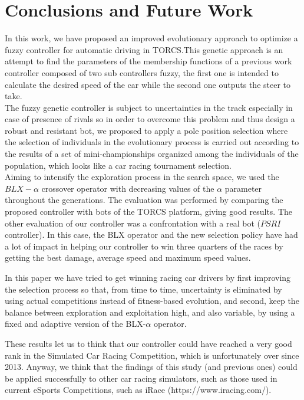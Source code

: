 \documentclass[conference]{IEEEtran}
\begin{document}
\section{Conclusions and Future Work} 
\label{sec:conclusions}

In this work, we have proposed an improved evolutionary approach to optimize a fuzzy controller for automatic driving in TORCS.This genetic approach is an attempt to find the parameters of the membership functions of a previous work controller composed of two sub controllers fuzzy, the first one is intended to calculate the desired speed of the car while the second one outputs the steer to take.\\
The fuzzy genetic controller is subject to uncertainties in the track especially in case of presence of rivals so in order to overcome this problem and thus design a robust and resistant bot, we proposed to apply a pole position selection where the selection of individuals in the evolutionary process is carried out according to the results of a set of mini-championships organized among the individuals of the population, which looks like a car racing tournament selection.\\
Aiming to intensify the exploration process in the search space, we used the $BLX-\alpha$ crossover operator with decreasing values ​​of the $\alpha$ parameter throughout the generations.
The evaluation was performed by comparing the proposed controller with bots of the TORCS platform, giving good results.
The other evaluation of our controller was a confrontation with a real bot ($PSRI$ controller). In this case, the BLX operator and the new selection policy have had a lot of impact in helping our controller to win three quarters of the races by getting the best damage, average speed and maximum speed  values.

In this paper we have tried to get winning racing car drivers by
first improving the selection process so that, from time to time,
uncertainty is eliminated by using actual competitions instead of
fitness-based evolution, and second, keep the balance between
exploration and exploitation high, and also variable, by using a fixed
and adaptive version of the BLX-$\alpha$ operator.

These results let us to think that our controller could have reached a very good rank in the Simulated Car Racing Competition, which is unfortunately over since 2013. Anyway, we think that the findings of this study (and previous ones) could be applied successfully to other car racing simulators, such as those used in current eSports Competitions, such as iRace (https://www.iracing.com/).\\
\end{document}
